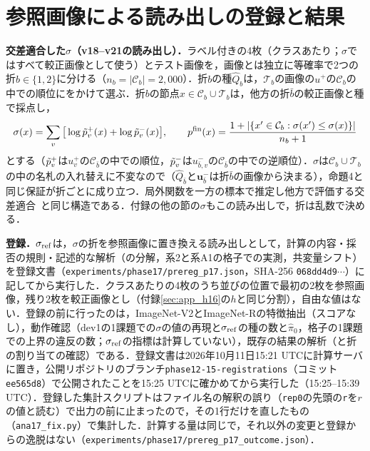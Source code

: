 \section{参照画像による読み出しの登録と結果}
\label{sec:app_p17}
\textbf{交差適合した$\sigma$（v18--v21の読み出し）．}ラベル付きの4枚（クラスあたり；$\sigma$ではすべて較正画像として使う）とテスト画像を，画像とは独立に等確率で2つの折$b\in\{1,2\}$に分ける（$n_b=|\mathcal{C}_b|=2{,}000$）．折$b$の種$\hat{Q}_b$は，$\mathcal{T}_b$の画像の$u^{+}$の$\mathcal{C}_b$の中での順位にをかけて選ぶ．折$b$の節点$x\in\mathcal{C}_b\cup\mathcal{T}_b$は，他方の折$\bar b$の較正画像と種で採点し，
\begin{equation*}
\sigma(x)=\sum_v\big[\log\tilde{p}^{+}_v(x)+\log\tilde{p}^{-}_v(x)\big],\qquad p^{\mathrm{fin}}(x)=\frac{1+|\{x'\in\mathcal{C}_b:\sigma(x')\le\sigma(x)\}|}{n_b+1}
\end{equation*}
とする（$\tilde{p}^{+}_v$は$u^{+}_v$の$\mathcal{C}_{\bar b}$の中での順位，$\tilde{p}^{-}_v$は$u^{-}_{\bar b,v}$の$\mathcal{C}_{\bar b}$の中での逆順位）．$\sigma$は$\mathcal{C}_b\cup\mathcal{T}_b$の中の名札の入れ替えに不変なので（$\hat{Q}_{\bar b}$と$\mathbf{u}^{-}_{\bar b}$は折$\bar b$の画像から決まる），命題4と同じ保証が折ごとに成り立つ．局外関数を一方の標本で推定し他方で評価する交差適合~\cite{chernozhukov2018dml}と同じ構造である．付録の他の節の$\sigma$もこの読み出しで，折は乱数で決める．

\textbf{登録．}$\sigma_{\mathrm{ref}}$は，$\sigma$の折を参照画像に置き換える読み出しとして，計算の内容・採否の規則・記述的な解析（の分解，系2と系A1の格子での実測，共変量シフト）を登録文書（\texttt{experiments/phase17/prereg\_p17.json}，SHA-256 \texttt{068dd4d9}$\cdots$）に記してから実行した．クラスあたりの4枚のうち並びの位置で最初の2枚を参照画像，残り2枚を較正画像とし（付録\ref{sec:app_h16}の$h$と同じ分割），自由な値はない．登録の前に行ったのは，ImageNet-V2とImageNet-Rの特徴抽出（スコアなし），動作確認（dev1の1課題での$\sigma$の値の再現と$\sigma_{\mathrm{ref}}$の種の数と$\hat\pi_0$，格子の1課題での上界の違反の数；$\sigma_{\mathrm{ref}}$の指標は計算していない），既存の結果の解析（と折の割り当ての確認）である．登録文書は2026年10月11日15:21 UTCに計算サーバに置き，公開リポジトリのブランチ\texttt{phase12-15-registrations}（コミット\texttt{ee565d8}）で公開されたことを15:25 UTCに確かめてから実行した（15:25--15:39 UTC）．登録した集計スクリプトはファイル名の解釈の誤り（\texttt{rep0}の先頭の\texttt{r}を$r$の値と読む）で出力の前に止まったので，その1行だけを直したもの（\texttt{ana17\_fix.py}）で集計した．計算する量は同じで，それ以外の変更と登録からの逸脱はない（\texttt{experiments/phase17/prereg\_p17\_outcome.json}）．

